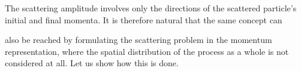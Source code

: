 The scattering amplitude involves only the directions of the scattered particle's initial and final momenta. It is therefore natural that the same concept can

also be reached by formulating the scattering problem in the momentum representation, where the spatial distribution of the process as a whole is not considered at all. Let us show how this is done.
